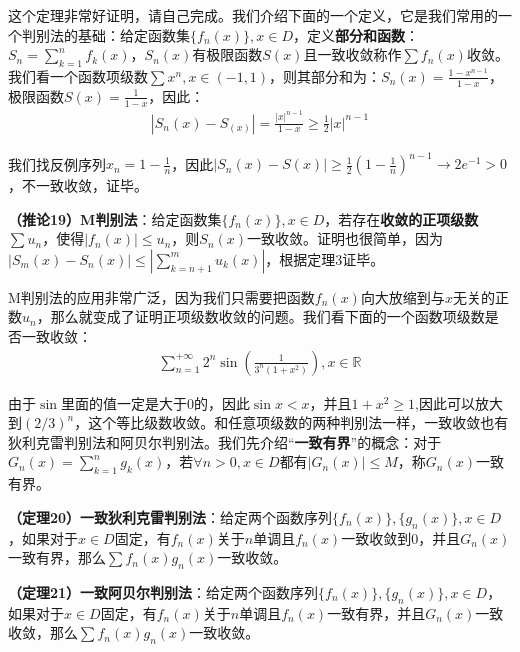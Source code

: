\documentclass{ctexart}
\let\oldtextbf\textbf
\renewcommand{\textbf}[1]{\textcolor{brown!50!red}{\oldtextbf{#1}}}
\begin{document}
这个定理非常好证明，请自己完成。我们介绍下面的一个定义，它是我们常用的一个判别法的基础：给定函数集$\{f_n(x)\},x\in D$，定义\textbf{\color{brown!50!red}部分和函数}：$S_n=\sum_{k=1}^n f_k(x)$，$S_n(x)$有极限函数$S(x)$且一致收敛称作$\sum f_n(x)$收敛。我们看一个函数项级数$\sum x^n,x\in(-1,1)$，则其部分和为：$S_n(x)=\frac{1-x^{n-1}}{1-x}$，极限函数$S(x)=\frac{1}{1-x}$，因此：
\begin{align*}
    |S_n(x)-S_(x)|=\frac{|x|^{n-1}}{1-x}\geq \frac{1}{2}|x|^{n-1}
\end{align*}

我们找反例序列$x_n=1-\frac{1}{n}$，因此$|S_n(x)-S(x)|\geq \frac{1}{2}(1-\frac{1}{n})^{n-1}\to 2e^{-1}>0$，不一致收敛，证毕。

\begin{tcolorbox}[
    colback=bac2,     %
    colframe=fra2,   %
    coltitle=white,             %
    coltext=tex2,
    title=M判别法,
    fonttitle=\bfseries,        %
arc=3mm,                     %
breakable
]
\textbf{\color{brown!50!red}（推论19）M判别法}：给定函数集$\{f_n(x)\},x\in D$，若存在\textbf{\color{brown!50!red}收敛的正项级数}$\sum u_n$，使得$|f_n(x)|\leq u_n$，则$S_n(x)$一致收敛。证明也很简单，因为$|S_m(x)-S_n(x)|\leq|\sum_{k=n+1}^m u_k(x)|$，根据定理3证毕。
\end{tcolorbox}

M判别法的应用非常广泛，因为我们只需要把函数$f_n(x)$向大放缩到与$x$无关的正数$u_n$，那么就变成了证明正项级数收敛的问题。我们看下面的一个函数项级数是否一致收敛：
\begin{align*}
    \sum_{n=1}^{+\infty}2^n\sin(\frac{1}{3^n(1+x^2)}),x\in \mathbb{R}
\end{align*}

由于$\sin$里面的值一定是大于0的，因此$\sin x<x$，并且$1+x^2\geq 1$,因此可以放大到$(2/3)^n$，这个等比级数收敛。和任意项级数的两种判别法一样，一致收敛也有狄利克雷判别法和阿贝尔判别法。我们先介绍“\textbf{\color{brown!50!red}一致有界}”的概念：对于$G_n(x)=\sum_{k=1}^n g_k(x)$，若$\forall n>0, x\in D$都有$|G_n(x)|\leq M$，称$G_n(x)$一致有界。
\begin{tcolorbox}[
    colback=bac2,     %
    colframe=fra2,   %
    coltitle=white,             %
    coltext=tex2,
    title=一致狄利克雷判别法,
    fonttitle=\bfseries,        %
arc=3mm,                     %
breakable
]
\textbf{\color{brown!50!red}（定理20）一致狄利克雷判别法}：给定两个函数序列$\{f_n(x)\},\{g_n(x)\},x\in D$，如果对于$x\in D$固定，有$f_n(x)$关于$n$单调且$f_n(x)$一致收敛到0，并且$G_n(x)$一致有界，那么$\sum f_n(x)g_n(x)$一致收敛。
\end{tcolorbox}
\begin{tcolorbox}[
    colback=bac2,     %
    colframe=fra2,   %
    coltitle=white,             %
    coltext=tex2,
    title=一致阿贝尔判别法,
    fonttitle=\bfseries,        %
arc=3mm,                     %
breakable
]
\textbf{\color{brown!50!red}（定理21）一致阿贝尔判别法}：给定两个函数序列$\{f_n(x)\},\{g_n(x)\},x\in D$，如果对于$x\in D$固定，有$f_n(x)$关于$n$单调且$f_n(x)$一致有界，并且$G_n(x)$一致收敛，那么$\sum f_n(x)g_n(x)$一致收敛。
\end{tcolorbox}
\end{document}
